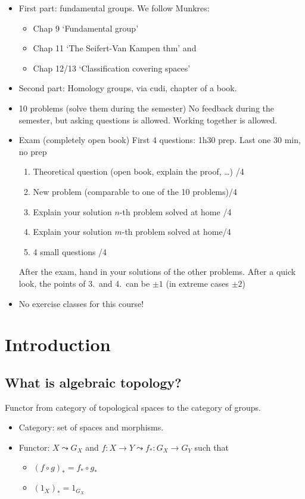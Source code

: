 

\begin{itemize}
    \item First part: fundamental groups. We follow Munkres:
        \begin{itemize}
            \item Chap 9 `Fundamental group'
            \item Chap 11 `The Seifert-Van Kampen thm' and
            \item Chap 12/13 `Classification covering spaces'
        \end{itemize}
    \item Second part: Homology groups, via cudi, chapter of a book.
    \item 10 problems (solve them during the semester) No feedback during the semester, but asking questions is allowed. Working together is allowed.
    \item Exam (completely open book) First 4 questions: 1h30 prep. Last one 30 min, no prep
        \begin{enumerate}
            \item Theoretical question (open book, explain the proof, \ldots) \hfill /4
            \item New problem (comparable to one of the 10 problems)\hfill /4
            \item Explain your solution $n$-th problem solved at home \hfill /4
            \item Explain your solution $m$-th problem solved at home\hfill /4
            \item 4 small questions \hfill /4
        \end{enumerate}
        After the exam, hand in your solutions of the other problems. After a quick look, the points of 3.\ and 4.\ can be $\pm 1$ (in extreme cases $\pm 2$)
    \item No exercise classes for this course!
\end{itemize}

\setcounter{chapter}{-1}
\chapter{Introduction}

\section{What is algebraic topology?}
Functor from category of topological spaces to the category of groups.
\begin{itemize}
    \item Category: set of spaces and morphisms.
    \item Functor: $X \leadsto G_X$ and  $f:X\to Y \leadsto f_*: G_X \to  G_Y$ such that
        \begin{itemize}
            \item $(f \circ g)_* = f_* \circ g_* $
            \item $(1_X)_* = 1_{G_X}$
        \end{itemize}
\end{itemize}

